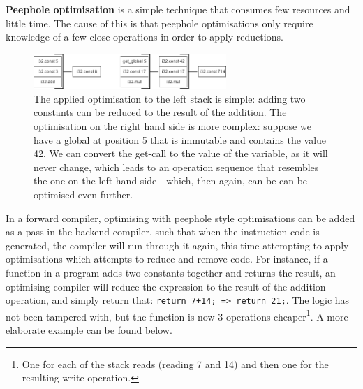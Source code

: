 \documentclass[a4paper]{article}
\begin{document}
\textbf{Peephole optimisation} is a simple technique that consumes few resources and little time. The cause of this is that peephole optimisations only require knowledge of a few close operations in order to apply reductions.

\begin{figure}[H]
	\includegraphics[width=0.65\textwidth]{PeepholeOptimisationIllustrations}
	\centering
	\caption{The applied optimisation to the left stack is simple: adding two constants can be reduced to the result of the addition. The optimisation on the right hand side is more complex: suppose we have a global at position 5 that is immutable and contains the value 42. We can convert the get-call to the value of the variable, as it will never change, which leads to an operation sequence that resembles the one on the left hand side - which, then again, can be can be optimised even further.}
\end{figure}

In a forward compiler, optimising with peephole style optimisations can be added as a pass in the backend compiler, such that when the instruction code is generated, the compiler will run through it again, this time attempting to apply optimisations which attempts to reduce and remove code. For instance, if a function in a program adds two constants together and returns the result, an optimising compiler will reduce the expression to the result of the addition operation, and simply return that: \texttt{return 7+14; => return 21;}. The logic has not been tampered with, but the function is now 3 operations cheaper\footnote{One for each of the stack reads (reading 7 and 14) and then one for the resulting write operation.}. A more elaborate example can be found below.
\end{document}
